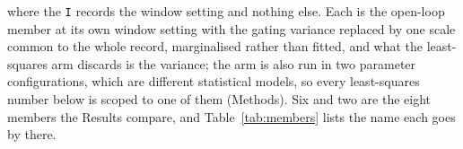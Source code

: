 where the \texttt{I} records the window setting and nothing else. Each is the open-loop
member at its own window setting with the gating variance replaced by one scale common to the
whole record, marginalised rather than fitted, and what the least-squares arm discards is the
variance; the arm is also run in two parameter configurations, which are different statistical
models, so every least-squares number below is scoped to one of them (Methods).
Six and two are the eight members the Results compare, and Table~\ref{tab:members} lists the name
each goes by there.
